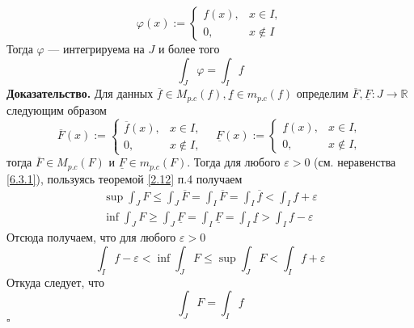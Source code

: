 \documentclass[a4paper]{article}
\newcommand{\qed}{\hfill$\square$}
\begin{document}
\begin{enumerate}
\begin{equation*}
        \varphi(x):=\begin{cases}
            f(x),& x\in I,\\
            0,& x\notin I
        \end{cases}
    \end{equation*}
    Тогда $\varphi$ — интегрируема на $J$ и более того
    \begin{equation*}
        \int_J\varphi=\int_I f
    \end{equation*}
    \textbf{Доказательство.} Для данных $\overline{f}\in M_{p.c}(f),\underline{f}\in m_{p.c}(f)$ определим $\overline{F},\underline{F}:J\rightarrow\mathbb{R}$ следующим образом
    \begin{equation*}
        \overline{F}(x):=\begin{cases}
            \overline{f}(x),&x\in I,\\
            0,&x\notin I,
        \end{cases}\quad\underline{F}(x):=\begin{cases}
            \underline{f}(x),&x\in I,\\
            0,&x\notin I,
        \end{cases}
    \end{equation*}
    тогда $\overline{F}\in M_{p.c}(F)$ и $\underline{F}\in m_{p.c}(F)$. Тогда для любого $\varepsilon>0$ (см. неравенства \ref{6.3.1}), пользуясь теоремой \ref{2.12} п.4 получаем
    $$\begin{aligned}
        \sup\int_J F\leqslant\int_J\overline{F}=\int_I\overline{F}=\int_I\overline{f}<\int_I f+\varepsilon\\[1mm]
        \inf\int_J F\geqslant\int_J\underline{F}=\int_I\underline{F}=\int_I\underline{f}>\int_I f-\varepsilon
    \end{aligned}$$
    Отсюда получаем, что для любого $\varepsilon>0$
    \begin{equation*}
        \int_I f-\varepsilon<\inf\int_J F\leqslant\sup\int_J F<\int_I f+\varepsilon
    \end{equation*}
    Откуда следует, что
    \begin{equation*}
        \int_J F=\int_I f
    \end{equation*}\qed

\end{enumerate}
\end{document}
